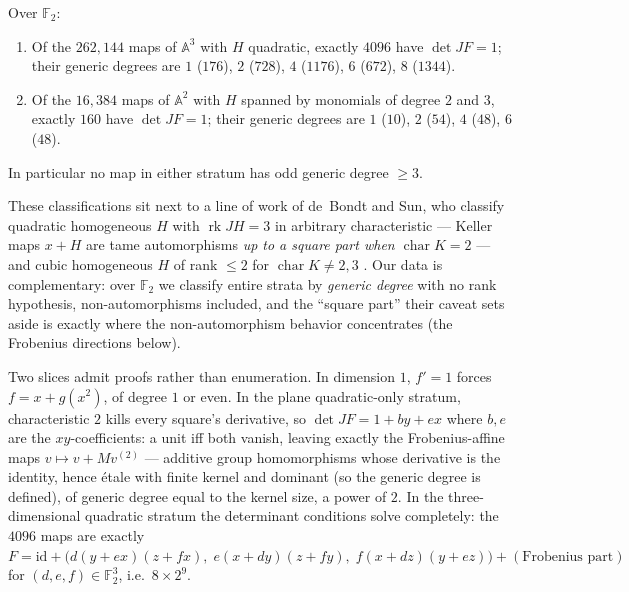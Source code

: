 \documentclass[11pt]{amsart}
\newcommand{\F}{\mathbb{F}}
\newcommand{\A}{\mathbb{A}}
\begin{document}
\begin{theorem}
\label{thm:parity}
Over $\F_2$:
\begin{enumerate}
\item Of the $262{,}144$ maps of $\A^3$ with $H$ quadratic, exactly
$4096$ have $\det JF = 1$; their generic degrees are
$1$ ($176$), $2$ ($728$), $4$ ($1176$), $6$ ($672$), $8$ ($1344$).
\item Of the $16{,}384$ maps of $\A^2$ with $H$ spanned by monomials of
degree $2$ and $3$, exactly $160$ have $\det JF = 1$; their generic
degrees are $1$ ($10$), $2$ ($54$), $4$ ($48$), $6$ ($48$).
\end{enumerate}
In particular no map in either stratum has odd generic degree $\ge 3$.
\end{theorem}

These classifications sit next to a line of work of de~Bondt and Sun,
who classify quadratic homogeneous $H$ with $\operatorname{rk} JH = 3$
in arbitrary characteristic --- Keller maps $x+H$ are tame automorphisms
\emph{up to a square part when $\operatorname{char} K = 2$}
\cite{bs-quadratic} --- and cubic homogeneous $H$ of rank $\le 2$ for
$\operatorname{char} K \ne 2, 3$ \cite{bs-cubic}. Our data is
complementary: over $\F_2$ we classify entire strata by \emph{generic
degree} with no rank hypothesis, non-automorphisms included, and the
``square part'' their caveat sets aside is exactly where the
non-automorphism behavior concentrates (the Frobenius directions
below).

Two slices admit proofs rather than enumeration. In dimension $1$,
$f' = 1$ forces $f = x + g(x^2)$, of degree $1$ or even. In the plane
quadratic-only stratum, characteristic $2$ kills every square's
derivative, so $\det JF = 1 + b y + e x$ where $b, e$ are the
$xy$-coefficients: a unit iff both vanish, leaving exactly the
Frobenius-affine maps $v \mapsto v + M v^{(2)}$ --- additive group
homomorphisms whose derivative is the identity, hence \'etale with
finite kernel and dominant (so the generic degree is defined), of
generic degree equal to the kernel size, a power of $2$. In the three-dimensional quadratic stratum the determinant
conditions solve completely: the $4096$ maps are exactly
$F = \mathrm{id} + \bigl(d(y{+}ex)(z{+}fx),\; e(x{+}dy)(z{+}fy),\;
f(x{+}dz)(y{+}ez)\bigr) + (\text{Frobenius part})$ for
$(d,e,f) \in \F_2^3$, i.e.\ $8 \times 2^9$.
\end{document}
